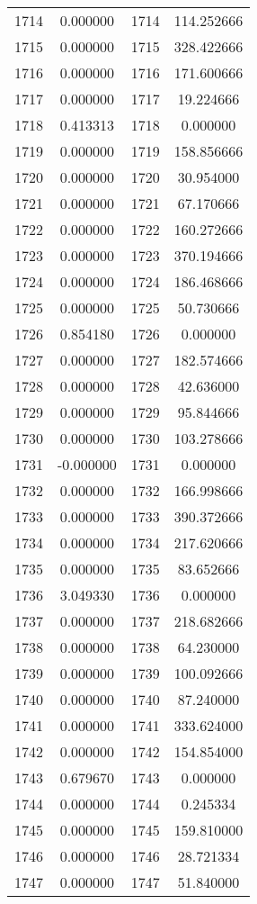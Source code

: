 \documentclass[12pt]{article}
\begin{document}
\begin{longtable}{@{}cccc@{}}
1714 & 0.000000 & 1714 & 114.252666 \\
1715 & 0.000000 & 1715 & 328.422666 \\
1716 & 0.000000 & 1716 & 171.600666 \\
1717 & 0.000000 & 1717 & 19.224666 \\
1718 & 0.413313 & 1718 & 0.000000 \\
1719 & 0.000000 & 1719 & 158.856666 \\
1720 & 0.000000 & 1720 & 30.954000 \\
1721 & 0.000000 & 1721 & 67.170666 \\
1722 & 0.000000 & 1722 & 160.272666 \\
1723 & 0.000000 & 1723 & 370.194666 \\
1724 & 0.000000 & 1724 & 186.468666 \\
1725 & 0.000000 & 1725 & 50.730666 \\
1726 & 0.854180 & 1726 & 0.000000 \\
1727 & 0.000000 & 1727 & 182.574666 \\
1728 & 0.000000 & 1728 & 42.636000 \\
1729 & 0.000000 & 1729 & 95.844666 \\
1730 & 0.000000 & 1730 & 103.278666 \\
1731 & -0.000000 & 1731 & 0.000000 \\
1732 & 0.000000 & 1732 & 166.998666 \\
1733 & 0.000000 & 1733 & 390.372666 \\
1734 & 0.000000 & 1734 & 217.620666 \\
1735 & 0.000000 & 1735 & 83.652666 \\
1736 & 3.049330 & 1736 & 0.000000 \\
1737 & 0.000000 & 1737 & 218.682666 \\
1738 & 0.000000 & 1738 & 64.230000 \\
1739 & 0.000000 & 1739 & 100.092666 \\
1740 & 0.000000 & 1740 & 87.240000 \\
1741 & 0.000000 & 1741 & 333.624000 \\
1742 & 0.000000 & 1742 & 154.854000 \\
1743 & 0.679670 & 1743 & 0.000000 \\
1744 & 0.000000 & 1744 & 0.245334 \\
1745 & 0.000000 & 1745 & 159.810000 \\
1746 & 0.000000 & 1746 & 28.721334 \\
1747 & 0.000000 & 1747 & 51.840000 \\

\end{longtable}
\end{document}
